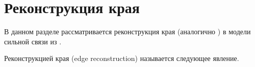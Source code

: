\section{Реконструкция края}
В данном разделе рассматривается реконструкция края (аналогично \cite{Wang2017}) 
в модели сильной связи из \cite{Bernevig2006}.

Реконструкцией края (edge reconstruction) называется следующее явление.
